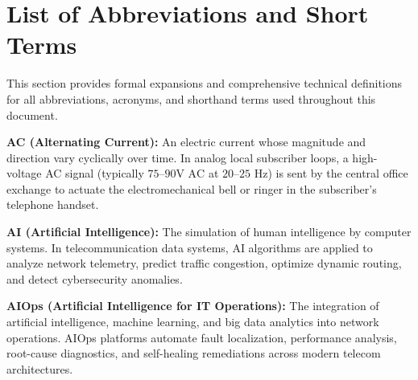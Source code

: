 \documentclass[12pt,a4paper]{report}
\begin{document}
\begingroup
\singlespacing
\makeatletter
\renewcommand*\l@chapter[2]{%
  \ifnum \c@tocdepth >\m@ne
    \addpenalty{-\@highpenalty}%
    \vskip 0.4em \@plus\p@
    \setlength\@tempdima{1.5em}%
    \begingroup
      \parindent \z@ \rightskip \@pnumwidth
      \parfillskip -\@pnumwidth
      \leavevmode \bfseries
      \advance\leftskip\@tempdima
      \hskip -\leftskip
      #1\nobreak\hfil \nobreak\hb@xt@\@pnumwidth{\hss #2}\par
      \penalty\@highpenalty
    \endgroup
  \fi}
\makeatother
\tableofcontents
\endgroup
\clearpage

\begingroup
\singlespacing
\let\clearpage\relax
\let\cleardoublepage\relax
\vspace*{-0.5cm}
\listoffigures
\vspace{1.5cm}
\listoftables
\endgroup
\clearpage

\chapter*{List of Abbreviations and Short Terms}

This section provides formal expansions and comprehensive technical definitions for all abbreviations, acronyms, and shorthand terms used throughout this document.

\vspace{0.3cm}

\noindent\textbf{AC (Alternating Current):} An electric current whose magnitude and direction vary cyclically over time. In analog local subscriber loops, a high-voltage AC signal (typically $75\text{--}90\text{V AC}$ at $20\text{--}25\text{ Hz}$) is sent by the central office exchange to actuate the electromechanical bell or ringer in the subscriber's telephone handset.

\vspace{0.2cm}
\noindent\textbf{AI (Artificial Intelligence):} The simulation of human intelligence by computer systems. In telecommunication data systems, AI algorithms are applied to analyze network telemetry, predict traffic congestion, optimize dynamic routing, and detect cybersecurity anomalies.

\vspace{0.2cm}
\noindent\textbf{AIOps (Artificial Intelligence for IT Operations):} The integration of artificial intelligence, machine learning, and big data analytics into network operations. AIOps platforms automate fault localization, performance analysis, root-cause diagnostics, and self-healing remediations across modern telecom architectures.
\end{document}
